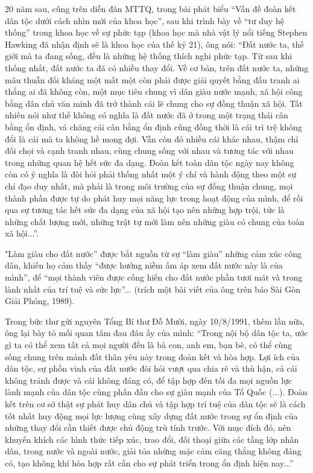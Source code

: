 20 năm sau, cũng trên diễn đàn MTTQ, trong bài phát biểu “Vấn đề đoàn kết dân tộc dưới cách nhìn mới của khoa học”, sau khi trình bày về “tư duy hệ thống” trong khoa học về sự phức tạp (khoa học mà nhà vật lý nổi tiếng Stephen Hawking đã nhận định sẽ là khoa học của thế kỷ 21), ông nói: “Đất nước ta, thế giới mà ta đang sống, đều là những hệ thống thích nghi phức tạp. Từ sau khi thống nhất, đất nước ta đã có nhiều thay đổi. Về cơ bản, trên đất nước ta, những mâu thuẫn đối kháng một mất một còn phải được giải quyết bằng đấu tranh ai thắng ai đã không còn, một mục tiêu chung vì dân giàu nước mạnh, xã hội công bằng dân chủ văn minh đã trở thành cái lẽ chung cho sự đồng thuận xã hội. Tất nhiên nói như thế không có nghĩa là đất nước đã ở trong một trạng thái cân bằng ổn định, vả chăng cái cân bằng ổn định cũng đồng thời là cái trì trệ không đổi là cái mà ta không hề mong đợi. Vẫn còn đó nhiều cái khác nhau, thậm chí đối chọi và cạnh tranh nhau, cùng chung sống với nhau và tương tác với nhau trong những quan hệ hết sức đa dạng. Đoàn kết toàn dân tộc ngày nay không còn có ý nghĩa là đòi hỏi phải thống nhất một ý chí và hành động theo một sự chỉ đạo duy nhất, mà phải là trong môi trường của sự đồng thuận chung, mọi thành phần được tự do phát huy mọi năng lực trong hoạt động của mình, để rồi qua sự tương tác hết sức đa dạng của xã hội tạo nên những hợp trội, tức là những chất lượng mới, những trật tự mới làm nên những giàu có chung của toàn xã hội...”. 

"Làm giàu cho đất nước” được bắt nguồn từ sự “làm giàu” những cảm xúc công dân, khiến họ cảm thấy “được hưởng niềm ấm áp xem đất nước này là của mình”, để “mọi thành viên được cống hiến cho đất nước phần tươi mát và trong lành nhất của trí tuệ và sức lực”... (trích một bài viết của ông trên báo Sài Gòn Giải Phóng, 1989).

Trong bức thư gửi nguyên Tổng Bí thư Đỗ Mười, ngày 10/8/1991, thêm lần nữa, ông lại bày tỏ mối quan tâm đau đáu ấy của mình: “Trong nội bộ dân tộc ta, ước gì ta có thể xem tất cả mọi người đều là bà con, anh em, bạn bè, có thể cùng sống chung trên mảnh đất thân yêu này trong đoàn kết và hòa hợp. Lợi ích của dân tộc, sự phồn vinh của đất nước đòi hỏi vượt qua chia rẽ và thù hận, cả cái không tránh được và cái không đáng có, để tập hợp đến tối đa mọi nguồn lực lành mạnh của dân tộc cùng phấn đấu cho sự giàu mạnh của Tổ Quốc (...). Đoàn kết trên cơ sở thật sự phát huy dân chủ và tập hợp trí tuệ của dân tộc sẽ là cách tốt nhất huy động mọi lực lượng cùng xây dựng đất nước trong sự ổn định của những thay đổi cần thiết được chủ động trù tính trước. Với mục đích đó, nên khuyến khích các hình thức tiếp xúc, trao đổi, đối thoại giữa các tầng lớp nhân dân, trong nước và ngoài nước, giải tỏa những mặc cảm căng thẳng không đáng có, tạo không khí hòa hợp rất cần cho sự phát triển trong ổn định hiện nay...”

